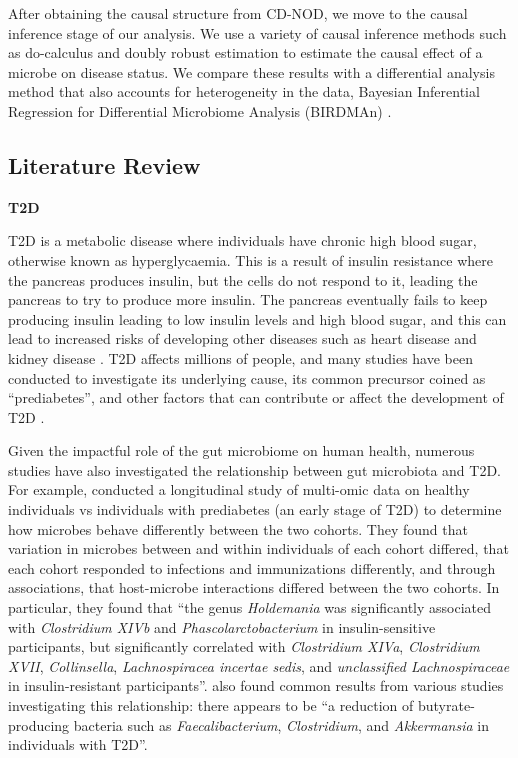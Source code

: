 \documentclass[12pt,letterpaper]{article}
\begin{document}
After obtaining the causal structure from CD-NOD, we move to the causal inference stage of our analysis. We use a variety of causal inference methods such as do-calculus and doubly robust estimation to estimate the causal effect of a microbe on disease status. We compare these results with a differential analysis method that also accounts for heterogeneity in the data, Bayesian Inferential Regression for Differential Microbiome Analysis (BIRDMAn) \citep{rahman2023birdman}. 

\subsection{Literature Review}

\textbf{T2D}

T2D is a metabolic disease where individuals have chronic high blood sugar, otherwise known as hyperglycaemia. This is a result of insulin resistance where the pancreas produces insulin, but the cells do not respond to it, leading the pancreas to try to produce more insulin. The pancreas eventually fails to keep producing insulin leading to low insulin levels and high blood sugar, and this can lead to increased risks of developing other diseases such as heart disease and kidney disease \citep{adat2d}. T2D affects millions of people, and many studies have been conducted to investigate its underlying cause, its common precursor coined as “prediabetes”, and other factors that can contribute or affect the development of T2D \citep{tabak2012prediabetes, qin2012mgwast2d, mehta2000hcvt2d}. 

Given the impactful role of the gut microbiome on human health, numerous studies have also investigated the relationship between gut microbiota and T2D. For example, \citep{zhou2019t2d} conducted a longitudinal study of multi-omic data on healthy individuals vs individuals with prediabetes (an early stage of T2D) to determine how microbes behave differently between the two cohorts. They found that variation in microbes between and within individuals of each cohort differed, that each cohort responded to infections and immunizations differently, and through associations, that host-microbe interactions differed between the two cohorts. In particular, they found that “the genus \textit{Holdemania} was significantly associated with \textit{Clostridium XIVb} and \textit{Phascolarctobacterium} in insulin-sensitive participants, but significantly correlated with \textit{Clostridium XIVa}, \textit{Clostridium XVII}, \textit{Collinsella}, \textit{Lachnospiracea incertae sedis}, and \textit{unclassified Lachnospiraceae} in insulin-resistant participants”. \citep{baars2024gutt2d} also found common results from various studies investigating this relationship: there appears to be “a reduction of butyrate-producing bacteria such as \textit{Faecalibacterium}, \textit{Clostridium}, and \textit{Akkermansia} in individuals with T2D”. 
\end{document}
